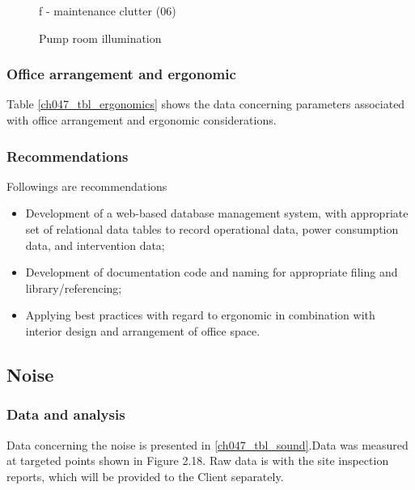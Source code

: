\begin{figure}
\begin{minipage}[b]{0.3\linewidth}
		\caption*{f - maintenance clutter (06)}
		\label{ch047_wem_housekeeping7}
	\end{minipage}
\caption{Pump room illumination}
\label{pump_room_housekeeping}
\end{figure}




\subsubsection{Office arrangement and ergonomic}
Table \ref{ch047_tbl_ergonomics} shows the data concerning parameters associated with office arrangement and ergonomic considerations.




%

\subsubsection{Recommendations}
Followings are recommendations

\begin{itemize}
\item Development of a web-based database management system, with appropriate set of relational data tables to record operational data, power consumption data, and intervention data;

\item Development of documentation code and naming for appropriate filing and library/referencing;

\item Applying best practices with regard to ergonomic in combination with interior design and arrangement of office space.

\end{itemize}





\subsection{Noise}\label{aq06}
\subsubsection{Data and analysis}
Data concerning the noise is presented in \ref{ch047_tbl_sound}.Data was measured at targeted points shown in Figure 2.18. Raw data is with the site inspection reports, which will be provided to the Client separately. 

